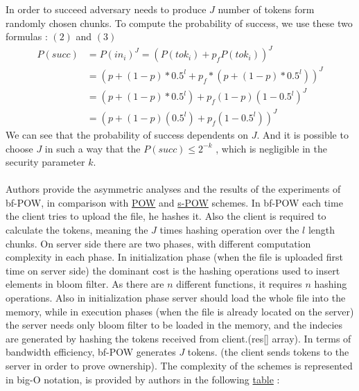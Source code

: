 \documentclass[12pt]{article}
\begin{document}
In order to succeed adversary needs to produce $J$ number of tokens form randomly chosen chunks. To compute the probability of success, we use these two formulas : $(2)$ and $(3)$
\begin{equation}\label{3}
\begin{split}
P(succ)& =P(in_i)^J=(P(tok_i)+p_fP(tok_i))^J\\
       & =(p+(1-p)*0.5^l + p_f*(p+(1-p)*0.5^l))^J\\
       & =(p+(1-p)*0.5^l)+p_f(1-p)(1-0.5^l)^J \\
       & =(p+(1-p)(0.5^l)+p_f(1-0.5^l))^J
\end{split}
\end{equation}
We can see that the probability   of success dependents on $J$. And it is possible to choose $J$ in such a way that the $P(succ) \leq 2^{-k}$ , which is negligible in the security parameter $k$.\\\\
Authors provide the asymmetric analyses and the results of the experiments of bf-POW, in comparison with \hyperref[sub:Soltuion1]{POW} and \hyperref[sub:Soltuion2]{s-POW} schemes. In bf-POW each time the client tries to upload the file, he hashes it. Also the client is required to calculate the tokens, meaning the $J$ times hashing operation over the $l$ length chunks. On server side there are two phases, with different computation complexity in each phase. In initialization phase (when the file is uploaded first time on server side) the dominant cost is the hashing operations used to insert elements in bloom filter. As there are $n$ different functions, it requires $n$ hashing operations. Also in initialization phase server should load the whole file into the memory, while in execution phases (when the file is already located on the server) the server needs only bloom filter to be loaded in the memory, and the indecies are generated by hashing the tokens received from client.(res[] array). In terms of bandwidth efficiency, bf-POW generates $J$ tokens. (the client sends tokens to the server in order to prove ownership). 
The complexity of the schemes is represented in big-O notation, is provided by authors in the following  \hyperref[table:asymptoticAnalysisBF-POW]{table} : 
\end{document}
